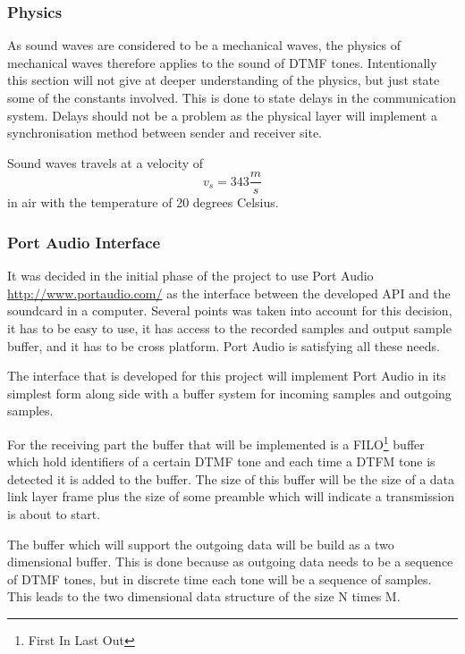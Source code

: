 		\subsubsection{Physics}
		As sound waves are considered to be a mechanical waves, the physics of mechanical waves therefore
		applies to the sound of DTMF tones. Intentionally this section will not give at deeper understanding
		of the physics, but just state some of the constants involved. This is done to state delays in the
		communication system. Delays should not be a problem as the physical layer will implement a
		synchronisation method between sender and receiver site.
		
		Sound waves travels at a velocity of
		\begin{equation}v_{s} = 343 \frac{m}{s}\end{equation}
		in air with the temperature of 20 degrees Celsius.
		
		\subsubsection{Port Audio Interface}
		It was decided in the initial phase of the project to use Port Audio \url{http://www.portaudio.com/}
		as the interface between the developed API and the soundcard in a computer. Several points
		was taken into account for this decision, it has to be easy to use, it has access to the recorded
		samples and output sample buffer, and it has to be cross platform. Port Audio is satisfying all these needs.

		The interface that is developed for this project will implement Port Audio in its simplest
		form along side with a buffer system for incoming samples and outgoing samples.
		
		For the receiving part the buffer that will be implemented is a FILO\footnote{First In Last Out}
		buffer which hold identifiers of a certain DTMF tone and each time a DTFM tone is detected it is added
		to the buffer. The size of this buffer will be the size of a data link layer frame plus the size of some
		preamble which will indicate a transmission is about to start.
		
		The buffer which will support the outgoing data will be build as a two dimensional buffer. This
		is done because as outgoing data needs to be a sequence of DTMF tones, but in discrete time each
		tone will be a sequence of samples. This leads to the two dimensional data structure of the size N times M.
		
